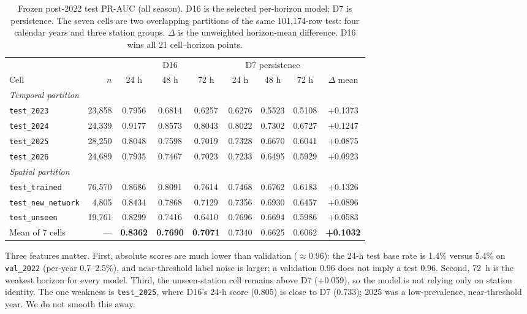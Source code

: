 \documentclass[conference]{IEEEtran}
\newcommand{\best}[1]{\textbf{#1}}
\begin{document}
\begin{table}[t]
\centering
\caption{Frozen post-2022 test PR-AUC (all season). D16 is the selected per-horizon model; D7 is persistence. The seven cells are two overlapping partitions of the same 101{,}174-row test: four calendar years and three station groups. $\Delta$ is the unweighted horizon-mean difference. D16 wins all 21 cell--horizon points.}
\label{tab:test}
\scriptsize
\setlength{\tabcolsep}{3.5pt}
\begin{tabular}{l r ccc ccc c}
\toprule
& & \multicolumn{3}{c}{D16} & \multicolumn{3}{c}{D7 persistence} & \\
\cmidrule(lr){3-5}\cmidrule(lr){6-8}
Cell & $n$ & 24 h & 48 h & 72 h & 24 h & 48 h & 72 h & $\Delta$ mean \\
\midrule
\multicolumn{9}{l}{\emph{Temporal partition}}\\
\texttt{test\_2023} & 23{,}858 & 0.7956 & 0.6814 & 0.6257 & 0.6276 & 0.5523 & 0.5108 & +0.1373 \\
\texttt{test\_2024} & 24{,}339 & 0.9177 & 0.8573 & 0.8043 & 0.8022 & 0.7302 & 0.6727 & +0.1247 \\
\texttt{test\_2025} & 28{,}250 & 0.8048 & 0.7598 & 0.7019 & 0.7328 & 0.6670 & 0.6041 & +0.0875 \\
\texttt{test\_2026} & 24{,}689 & 0.7935 & 0.7467 & 0.7023 & 0.7233 & 0.6495 & 0.5929 & +0.0923 \\
\midrule
\multicolumn{9}{l}{\emph{Spatial partition}}\\
\texttt{test\_trained} & 76{,}570 & 0.8686 & 0.8091 & 0.7614 & 0.7468 & 0.6762 & 0.6183 & +0.1326 \\
\texttt{test\_new\_network} & 4{,}805 & 0.8434 & 0.7868 & 0.7129 & 0.7356 & 0.6930 & 0.6457 & +0.0896 \\
\texttt{test\_unseen} & 19{,}761 & 0.8299 & 0.7416 & 0.6410 & 0.7696 & 0.6694 & 0.5986 & +0.0583 \\
\midrule
Mean of 7 cells & --- & \best{0.8362} & \best{0.7690} & \best{0.7071} & 0.7340 & 0.6625 & 0.6062 & \best{+0.1032} \\
\bottomrule
\end{tabular}
\end{table}

Three features matter. First, absolute scores are much lower than validation ($\approx$0.96): the 24-h test base rate is 1.4\% versus 5.4\% on \texttt{val\_2022} (per-year 0.7--2.5\%), and near-threshold label noise is larger; a validation 0.96 does not imply a test 0.96. Second, 72~h is the weakest horizon for every model. Third, the unseen-station cell remains above D7 (+0.059), so the model is not relying only on station identity. The one weakness is \texttt{test\_2025}, where D16's 24-h score (0.805) is close to D7 (0.733); 2025 was a low-prevalence, near-threshold year. We do not smooth this away.
\end{document}
